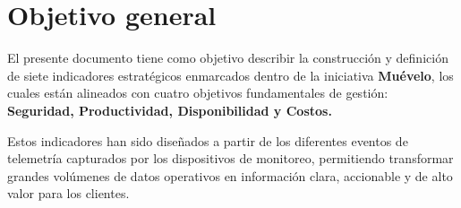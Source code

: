 \section{Objetivo general}
El presente documento tiene como objetivo describir la construcción y definición de siete indicadores estratégicos enmarcados dentro de la iniciativa \textbf{Muévelo}, los cuales están alineados con cuatro objetivos fundamentales de gestión: \textbf{Seguridad, Productividad, Disponibilidad y Costos.}

Estos indicadores han sido diseñados a partir de los diferentes eventos de telemetría capturados por los dispositivos de monitoreo, permitiendo transformar grandes volúmenes de datos operativos en información clara, accionable y de alto valor para los clientes.
